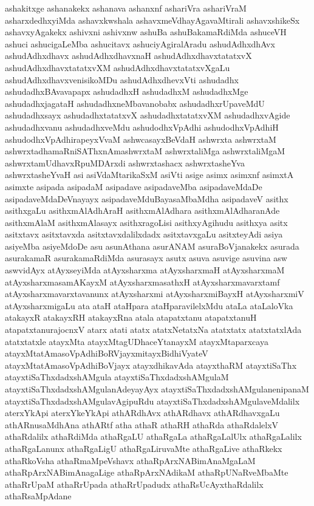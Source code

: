 {ashakitxge
ashanakekx
ashanava
ashanxnf
ashariVra
ashariVraM
asharxdedhxyiMda
ashavxkwshala
ashavxmeVdhayAgavaMtirali
ashavxshikeSx
ashavxyAgakekx
ashivxni
ashivxnw
ashuBa
ashuBakamaRdiMda
ashuceVH
ashuci
ashucigaLeMba
ashucitavx
ashuciyAgiralAradu
ashudAdhxdhAvx
ashudAdhxdhavx
ashudAdhxdhavxnaH
ashudAdhxdhavxtatatxvX
ashudAdhxdhavxtatatxvXM
ashudAdhxdhavxtatatxvXgaLu
ashudAdhxdhavxvenisikoMDu
ashudAdhxdhevxVti
ashudadhx
ashudadhxBAvavapapx
ashudadhxH
ashudadhxM
ashudadhxMge
ashudadhxjagataH
ashudadhxneMbavanobabx
ashudadhxrUpaveMdU
ashudadhxsayx
ashudadhxtatatxvX
ashudadhxtatatxvXM
ashudadhxvAgide
ashudadhxvanu
ashudadhxveMdu
ashudodhxVpAdhi
ashudodhxVpAdhiH
ashudodhxVpAdhirapeyxVvaM
ashwcasayxBeVdaH
ashwrxta
ashwrxtaM
ashwrxtadhamaRniSAThxnAmashwrxtaM
ashwrxtaliMga
ashwrxtaliMgaM
ashwrxtamUdhavxRpuMDArxdi
ashwrxtashacx
ashwrxtasheYva
ashwrxtasheYvaH
asi
asiVdaMtarikaSxM
asiVti
asige
asimx
asimxnf
asimxtA
asimxte
asipada
asipadaM
asipadave
asipadaveMba
asipadaveMdaDe
asipadaveMdaDeVnayayx
asipadaveMduBayasaMbaMdha
asipadaveV
asithx
asithxgaLu
asithxmAlAdhAraH
asithxmAlAdhara
asithxmAlAdharanAde
asithxmAlaM
asithxmAlasayx
asithxragoLisi
asithxyAgihudu
asithxya
asitx
asitxtavx
asitxtavxda
asitxtavxdalilxdadx
asitxtavxgaLu
asitxteyAdi
asiya
asiyeMba
asiyeMdoDe
asu
asunAthana
asurANAM
asuraBoVjanakekx
asurada
asurakamaR
asurakamaRdiMda
asurasayx
asutx
asuva
asuvige
asuvina
asw
aswvidAyx
atAyxseyiMda
atAyxsharxma
atAyxsharxmaH
atAyxsharxmaM
atAyxsharxmasamAKayxM
atAyxsharxmasathxH
atAyxsharxmavarxtamf
atAyxsharxmavarxtavanunx
atAyxsharxmi
atAyxsharxmiBayxH
atAyxsharxmiV
atAyxsharxmigaLu
ata
ataH
ataHpara
ataHparavilelxMdu
ataLa
ataLaloVka
atakayxR
atakayxRH
atakayxRna
atala
atapatxtanu
atapatxtanuH
atapatxtanurajocnxV
atarx
atati
atatx
atatxNetatxNa
atatxtatx
atatxtatxlAda
atatxtatxle
atayxMta
atayxMtagUDhaceYtanayxM
atayxMtaparxcaya
atayxMtatAmasoVpAdhiBoRVjayxmitayxBidhiVyateV
atayxMtatAmasoVpAdhiBoVjayx
atayxdhikavAda
atayxthaRM
atayxtiSaThx
atayxtiSaThxdadxshAMgula
atayxtiSaThxdadxshAMgulaM
atayxtiSaThxdadxshAMgulanAdeyayAyx
atayxtiSaThxdadxshAMgulanenipanaM
atayxtiSaThxdadxshAMgulavAgipuRdu
atayxtiSaThxdadxshAMgulaveMdalilx
aterxYkApi
aterxYkeYkApi
athARdhAvx
athARdhavx
athARdhavxgaLu
athARnusaMdhAna
athARtf
atha
athaR
athaRH
athaRda
athaRdalelxV
athaRdalilx
athaRdiMda
athaRgaLU
athaRgaLa
athaRgaLalUlx
athaRgaLalilx
athaRgaLanunx
athaRgaLigU
athaRgaLiruvaMte
athaRgaLive
athaRkekx
athaRkoVsha
athaRmaMpeVshavx
athaRpArxNABimAnaMgaLaM
athaRpArxNABimAnagaLige
athaRpArxNAdikaM
athaRpUNaRveMbaMte
athaRrUpaM
athaRrUpada
athaRrUpadudx
athaRsUcAyxthaRdalilx
athaRsaMpAdane
}
